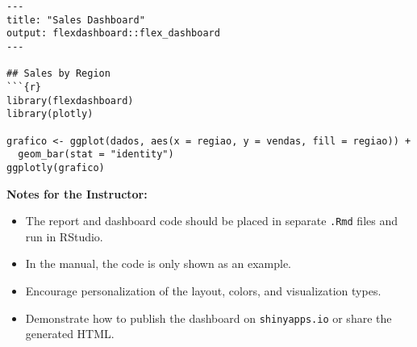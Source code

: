 \begin{lstlisting}
---
title: "Sales Dashboard"
output: flexdashboard::flex_dashboard
---

## Sales by Region
```{r}
library(flexdashboard)
library(plotly)

grafico <- ggplot(dados, aes(x = regiao, y = vendas, fill = regiao)) +
  geom_bar(stat = "identity")
ggplotly(grafico)
\end{lstlisting}

\textbf{Notes for the Instructor:} \begin{itemize} \item The report and dashboard code should be placed in separate \texttt{.Rmd} files and run in RStudio. \item In the manual, the code is only shown as an example. \item Encourage personalization of the layout, colors, and visualization types. \item Demonstrate how to publish the dashboard on \texttt{shinyapps.io} or share the generated HTML. \end{itemize}